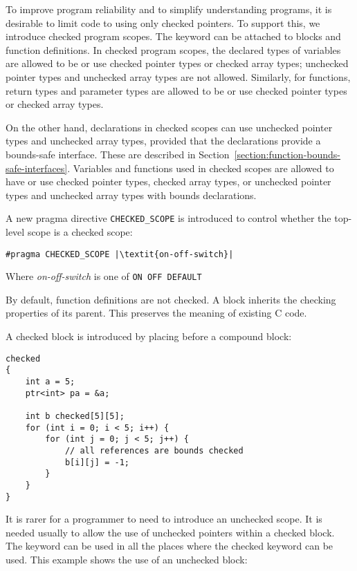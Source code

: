 To improve program reliability and to simplify understanding programs,
it is desirable to limit code to using only checked pointers. To support
this, we introduce checked program scopes. The  keyword
can be attached to blocks and function definitions. In checked program
scopes, the declared types of variables are allowed to be or use
checked pointer types or checked array types; unchecked pointer types
and unchecked array types are not allowed.  Similarly, for functions,
return types and parameter types are allowed to be or use checked pointer
types or checked array types.

On the other hand,  declarations in checked scopes can use unchecked pointer
types and unchecked array types, provided that the declarations provide a
bounds-safe interface.   These are described in
Section~\ref{section:function-bounds-safe-interfaces}.
Variables and functions used in checked scopes are
allowed to have or use checked pointer types, checked array types, or
unchecked pointer types and unchecked array types with bounds declarations.

A new pragma directive \lstinline|CHECKED_SCOPE| is introduced to control whether
the top-level scope is a checked scope:
\begin{lstlisting}[escapechar=\|]
#pragma CHECKED_SCOPE |\textit{on-off-switch}|
\end{lstlisting}

Where \textit{on-off-switch} is one of \lstinline|ON OFF DEFAULT|

By default, function definitions are not checked. A block inherits the
checking properties of its parent. This preserves the meaning of
existing C code.

A checked block is introduced by placing   before a
compound block:
\begin{lstlisting}
checked
{
    int a = 5;
    ptr<int> pa = &a;

    int b checked[5][5];
    for (int i = 0; i < 5; i++) {
        for (int j = 0; j < 5; j++) {
            // all references are bounds checked
            b[i][j] = -1;
        }
    }
}
\end{lstlisting}

It is rarer for a programmer to need to introduce an unchecked scope. It
is needed usually to allow the use of unchecked pointers within a checked
block. The  keyword can be used in all the places where the
checked keyword can be used. This example shows the use of an unchecked
block:

